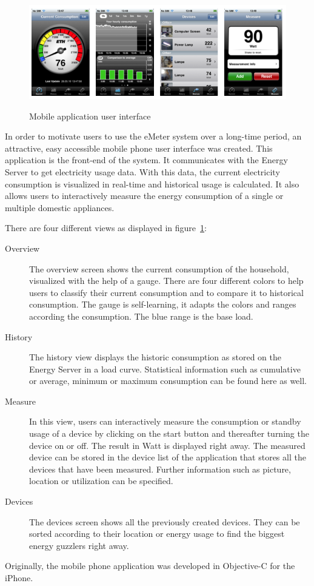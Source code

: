 \begin{center}
\begin{figure}
 \includegraphics[width=16cm]{Images/iphone_screens.png}
 \label{iphone_screens}
 \caption{Mobile application user interface}
\end{figure}
\end{center}
In order to motivate users to use the eMeter system over a long-time period, an attractive, easy accessible mobile phone user interface was created. This application is the front-end of the system. It communicates with the Energy Server to get electricity usage data.
With this data, the current electricity consumption is visualized in real-time and historical usage is calculated. It also allows users to interactively measure the energy consumption of a single or multiple domestic appliances. 

There are four different views as displayed in figure~\ref{iphone_screens}:

\begin{description}
 \item[Overview] The overview screen shows the current consumption of the household, visualized with the help of a gauge. There are four different colors to help users to classify their current consumption and to compare it to historical consumption. The gauge is self-learning, it adapts the colors and ranges according the consumption. The blue range is the base load.
 \item[History] The history view displays the historic consumption as stored on the Energy Server in a load curve. Statistical information such as cumulative or average, minimum or maximum consumption can be found here as well.
 \item[Measure] In this view, users can interactively measure the consumption or standby usage of a device by clicking on the start button and thereafter turning the device on or off. The result in Watt is displayed right away. The measured device can be stored in the device list of the application that stores all the devices that have been measured. Further information such as picture, location or utilization can be specified.
 \item[Devices] The devices screen shows all the previously created devices. They can be sorted according to their location or energy usage to find the biggest energy guzzlers right away.   
\end{description}
Originally, the mobile phone application was developed in Objective-C for the iPhone.

